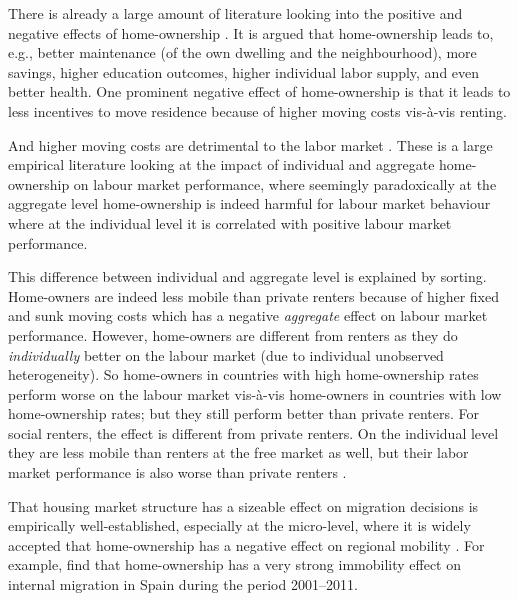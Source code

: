 \documentclass[fleqn,10pt]{SelfArx} %
\begin{document}
        There is already a large amount of literature looking into the positive
        and negative effects of home-ownership \citep[see for an
        overview][]{dietz2003social}. It is argued that home-ownership leads to,
        e.g., better maintenance (of the own dwelling and the neighbourhood),
        more savings, higher education outcomes, higher individual labor supply,
        and even better health. One prominent negative effect of home-ownership
        is that it leads to less incentives to move residence because of higher
        moving costs vis-\`{a}-vis renting.  
        
        And higher moving costs are detrimental to the labor market
        \citep{oswald1996conjecture, oswald1999housing}. These is a large
        empirical literature \citep[see, e.g., ][]{munch2006homeowners,
          munch2008home, de2013european} looking at the impact of individual and
        aggregate home-ownership on labour market performance, where seemingly
        paradoxically at the aggregate level home-ownership is indeed harmful
        for labour market behaviour where at the individual level it is
        correlated with positive labour market performance.
        
        This difference between individual and aggregate level is explained by
        sorting. Home-owners are indeed less mobile than private renters because
        of higher fixed and sunk moving costs which has a negative
        \emph{aggregate} effect on labour market performance. However,
        home-owners are different from renters as they do \emph{individually}
        better on the labour market (due to individual unobserved
        heterogeneity). So home-owners in countries with high home-ownership
        rates perform worse on the labour market vis-\`a-vis home-owners in
        countries with low home-ownership rates; but they still perform better
        than private renters. For social renters, the effect is different from
        private renters. On the individual level they are less mobile than
        renters at the free market as well, but their labor market performance
        is also worse than private renters \citep{hughes1981council,
          de2009homeownership}.
        
               That housing market structure has a sizeable effect on migration
        decisions is empirically well-established, especially at the
        micro-level, where it is widely accepted that home-ownership has a
        negative effect on regional mobility \citep{dietz2003social,
          dohmen2005housing}. For example, \citet{palomares2018understanding}
        find that home-ownership has a very strong immobility effect on internal
        migration in Spain during the period 2001--2011.
        
\end{document}
